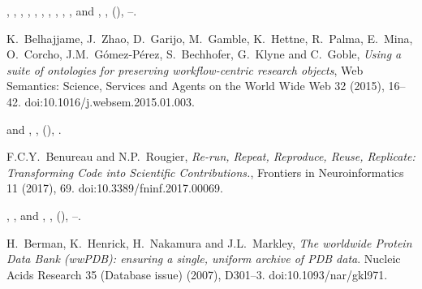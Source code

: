 \documentclass[ds,v1.1.2,openaccess]{iosart2x}%
\begin{document}
\begin{thebibliography}{}
%
\begin{barticle}
,
,
,
,
,
,
,
,
,
,
 and
,
,
(),
--.
\end{barticle}
%
\OrigBibText
K.~Belhajjame,
J.~Zhao,
D.~Garijo,
M.~Gamble,
K.~Hettne,
R.~Palma,
E.~Mina,
O.~Corcho,
J.M.~G\'{o}mez-P\'{e}rez,
S.~Bechhofer,
G.~Klyne and
C.~Goble,
\textit{Using a suite of ontologies for preserving workflow-centric research
objects},
Web Semantics: Science, Services and Agents on the World Wide Web
32
(2015),
16--42.
doi:10.1016/j.websem.2015.01.003.
\endOrigBibText
{}
\endbibitem

%
\begin{barticle}
 and
,
,
(),
.
\end{barticle}
%
\OrigBibText
F.C.Y.~Benureau and
N.P.~Rougier,
\textit{Re-run, Repeat, Reproduce, Reuse, Replicate: Transforming Code into
Scientific Contributions.},
Frontiers in Neuroinformatics
11
(2017),
69.
doi:10.3389/fninf.2017.00069.
\endOrigBibText
{}
\endbibitem

%
\begin{barticle}
,
,
 and
,
,
(),
--.
\end{barticle}
%
\OrigBibText
H.~Berman,
K.~Henrick,
H.~Nakamura and
J.L.~Markley,
\textit{The worldwide Protein Data Bank ({wwPDB}): ensuring a single, uniform
archive of {PDB} data}.
Nucleic Acids Research
35 (Database issue)
(2007),
D301--3.
doi:10.1093/nar/gkl971.
\endOrigBibText
{}
\endbibitem


\end{thebibliography}
\end{document}
